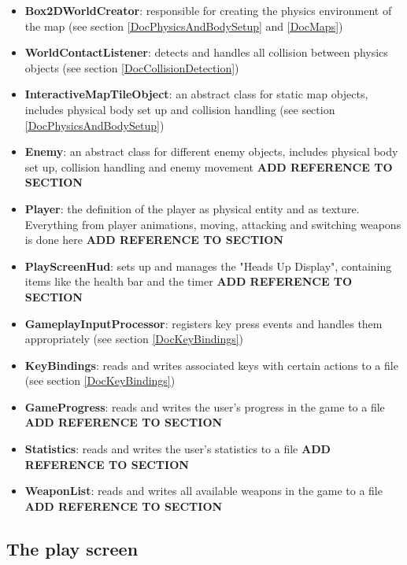 \documentclass[12p]{article}
\begin{document}
\begin{itemize}
  \item \textbf{Box2DWorldCreator}: responsible for creating the physics environment of the map (see section \ref{DocPhysicsAndBodySetup} and \ref{DocMaps})
  \item \textbf{WorldContactListener}: detects and handles all collision between physics objects (see section \ref{DocCollisionDetection})
  \item \textbf{InteractiveMapTileObject}: an abstract class for static map objects, includes physical body set up and collision handling (see section \ref{DocPhysicsAndBodySetup})
  \item \textbf{Enemy}: an abstract class for different enemy objects, includes physical body set up, collision handling and enemy movement \textbf{ADD REFERENCE TO SECTION}
  \item \textbf{Player}: the definition of the player as physical entity and as texture. Everything from player animations, moving, attacking and switching weapons is done here \textbf{ADD REFERENCE TO SECTION}
  \item \textbf{PlayScreenHud}: sets up and manages the "Heads Up Display", containing items like the health bar and the timer \textbf{ADD REFERENCE TO SECTION}
  \item \textbf{GameplayInputProcessor}: registers key press events and handles them appropriately (see section \ref{DocKeyBindings})
  \item \textbf{KeyBindings}: reads and writes associated keys with certain actions to a file (see section \ref{DocKeyBindings})
  \item \textbf{GameProgress}: reads and writes the user's progress in the game to a file \textbf{ADD REFERENCE TO SECTION}
  \item \textbf{Statistics}: reads and writes the user's statistics to a file \textbf{ADD REFERENCE TO SECTION}
  \item \textbf{WeaponList}: reads and writes all available weapons in the game to a file \textbf{ADD REFERENCE TO SECTION}
\end{itemize}

 
\subsection{The play screen} \label{DocPlayScreen}
 
\end{document}
